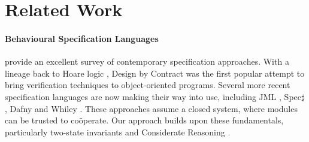 \section{Related Work}
\label{s:related}


\paragraph{Behavioural Specification Languages} 

\cite{behavSurvey2012} provide an excellent survey of
contemporary specification approaches.  With a lineage back to Hoare
logic \cite{Hoare69},  Design by Contract \cite{Meyer97} was the
first popular attempt to bring verification techniques to
object-oriented programs.  Several more recent specification languages are now making
their way into use, including JML
\cite{Leavens-etal07}, Spec$\sharp$ \cite{BarLeiSch05}, Dafny
\cite{dafny} and Whiley \cite{whiley15}. 
These approaches assume a closed system, where modules
can be trusted to co{\"o}perate. 
Our approach builds upon
these fundamentals, particularly 
two-state invariants \cite{usingHistory} and Considerate Reasoning \cite{Considerate}.
%



